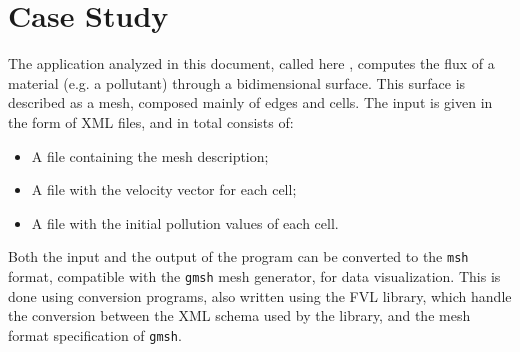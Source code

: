 \section{Case Study}

The application analyzed in this document, called here \polu, computes the flux of a material (e.g. a pollutant) through a bidimensional surface. This surface is described as a mesh, composed mainly of edges and cells. The input is given in the form of XML files, and in total consists of:

\begin{itemize}
	\item A file containing the mesh description;
	\item A file with the velocity vector for each cell;
	\item A file with the initial pollution values of each cell.
\end{itemize}

Both the input and the output of the program can be converted to the \texttt{msh} format, compatible with the \texttt{gmsh} mesh generator, for data visualization. This is done using conversion programs, also written using the FVL library, which handle the conversion between the XML schema used by the library, and the mesh format specification of \texttt{gmsh}.



